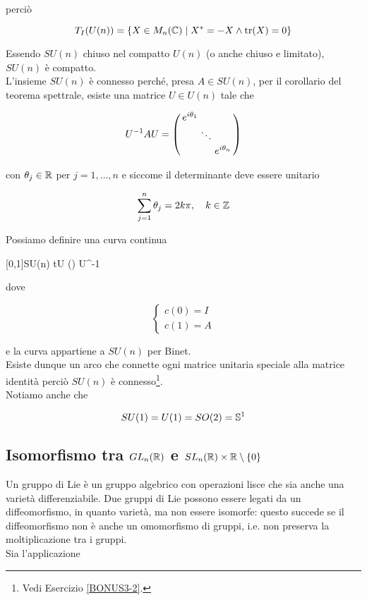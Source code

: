 perciò

\begin{equation}
	T_{I}(U(n)) = \{ X \in M_{n}(\C) \mid X^{*} = -X \wedge \tr(X) = 0 \}
\end{equation}

Essendo $ SU(n) $ chiuso nel compatto $ U(n) $ (o anche chiuso e limitato), $ SU(n) $ è compatto.\\
L'insieme $ SU(n) $ è connesso perché, presa $ A \in SU(n) $, per il corollario del teorema spettrale, esiste una matrice $ U \in U(n) $ tale che

\begin{equation}
	U^{-1} A U = %
	\smqty(\dmat{ e^{i \theta_{1}}, \ddots, e^{i \theta_{n}} })
\end{equation}

con $ \theta_{j} \in \R $ per $ j=1,\dots,n $ e siccome il determinante deve essere unitario

\begin{equation}
	\sum_{j=1}^{n} \theta_{j} = 2 k \pi \qcomma k \in \Z
\end{equation}

Possiamo definire una curva continua

%
	{[0,1]}{SU(n)}%
	{t}{U \smqty() U^{-1}}

dove

\begin{equation}
	\begin{cases}
		c(0) = I\\
		c(1) = A
	\end{cases}
\end{equation}

e la curva appartiene a $ SU(n) $ per Binet.\\
Esiste dunque un arco che connette ogni matrice unitaria speciale alla matrice identità perciò $ SU(n) $ è connesso\footnote{%
	Vedi Esercizio \ref{BONUS3-2}.%
}.\\
Notiamo anche che

\begin{equation}
	SU(1) = U(1) = SO(2) = \S^{1}
\end{equation}

\subsection{Isomorfismo tra $ GL_{n}(\R) $ e $ SL_{n}(\R) \times \R \setminus \{0\} $}

Un gruppo di Lie è un gruppo algebrico con operazioni lisce che sia anche una varietà differenziabile. Due gruppi di Lie possono essere legati da un diffeomorfismo, in quanto varietà, ma non essere isomorfe: questo succede se il diffeomorfismo non è anche un omomorfismo di gruppi, i.e. non preserva la moltiplicazione tra i gruppi.\\
Sia l'applicazione

